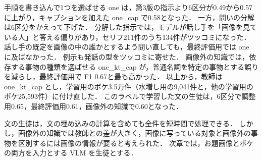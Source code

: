 手順を書き込んで1つを選ばせる one は，第3版の指示より6区分が0.49から0.57に上がり，キャプションを加えた one\_cap で0.58となった．
一方，問いの分解は6区分をかえって下げた．
分解した指示では，モデルが話し手を「画像を見ている人」と答える偏りがあり，セリフ211件のうち134件がツッコミになった．
話し手の既定を画像の中の誰かとするよう問い直しても，最終評価用では one に及ばなかった．
例示も発話の型をツッコミに寄せた．
画像外の知識では，依存する事物の種類を選ばせる one\_kt\_cap が，普通名詞を特定の事物とする誤りを減らし，最終評価用で F1 0.67と最も高かった．
以上から，教師は one\_kt\_cap とし，学習用のボケ3.5万件（水増し用の9,041件と，他の学習用のボケ25,593件）に付け直した．
このラベルで学習した文の生徒は，6区分で調整用0.65，最終評価用0.61，画像外の知識で0.60となった．

文の生徒は，文の埋め込みの計算を含めても全件を短時間で処理できる．
しかし，画像外の知識では教師との差が大きく，画像に写っている対象と画像外の事物を区別するには画像の情報が要ると考えられた．
次章では，お題画像とボケの両方を入力とする VLM を生徒とする．
